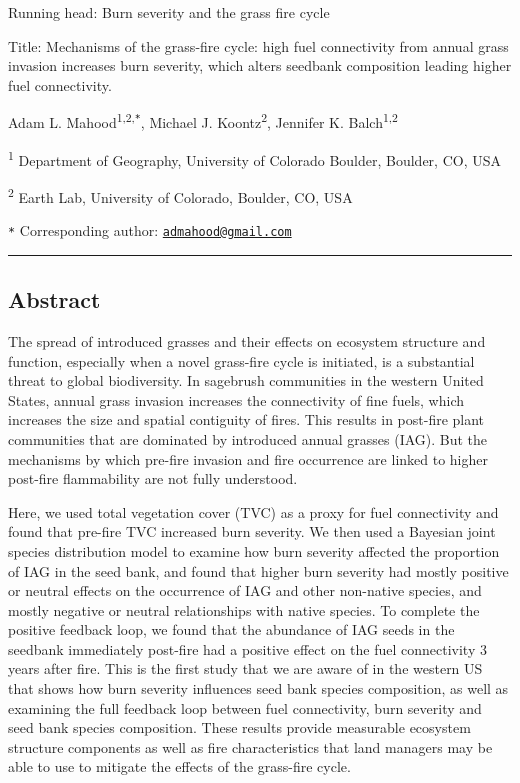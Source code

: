 \documentclass[
  12pt,
]{article}
\author{}
\date{\vspace{-2.5em}}
\begin{document}

Running head: Burn severity and the grass fire cycle

Title: Mechanisms of the grass-fire cycle: high fuel connectivity from
annual grass invasion increases burn severity, which alters seedbank
composition leading higher fuel connectivity.

Adam L. Mahood\textsuperscript{1,2,\texttt{*}}, Michael J.
Koontz\textsuperscript{2}, Jennifer K. Balch\textsuperscript{1,2}

\small

\textsuperscript{1} Department of Geography, University of Colorado
Boulder, Boulder, CO, USA

\textsuperscript{2} Earth Lab, University of Colorado, Boulder, CO, USA

\texttt{*} Corresponding author:
\href{mailto:admahood@gmail.com}{\nolinkurl{admahood@gmail.com}}

\normalsize

\newpage

\hrule

\linenumbers

\hypertarget{abstract}{%
\subsection{Abstract}\label{abstract}}

The spread of introduced grasses and their effects on ecosystem
structure and function, especially when a novel grass-fire cycle is
initiated, is a substantial threat to global biodiversity. In sagebrush
communities in the western United States, annual grass invasion
increases the connectivity of fine fuels, which increases the size and
spatial contiguity of fires. This results in post-fire plant communities
that are dominated by introduced annual grasses (IAG). But the
mechanisms by which pre-fire invasion and fire occurrence are linked to
higher post-fire flammability are not fully understood.

Here, we used total vegetation cover (TVC) as a proxy for fuel
connectivity and found that pre-fire TVC increased burn severity. We
then used a Bayesian joint species distribution model to examine how
burn severity affected the proportion of IAG in the seed bank, and found
that higher burn severity had mostly positive or neutral effects on the
occurrence of IAG and other non-native species, and mostly negative or
neutral relationships with native species. To complete the positive
feedback loop, we found that the abundance of IAG seeds in the seedbank
immediately post-fire had a positive effect on the fuel connectivity 3
years after fire. This is the first study that we are aware of in the
western US that shows how burn severity influences seed bank species
composition, as well as examining the full feedback loop between fuel
connectivity, burn severity and seed bank species composition. These
results provide measurable ecosystem structure components as well as
fire characteristics that land managers may be able to use to mitigate
the effects of the grass-fire cycle.
\end{document}
